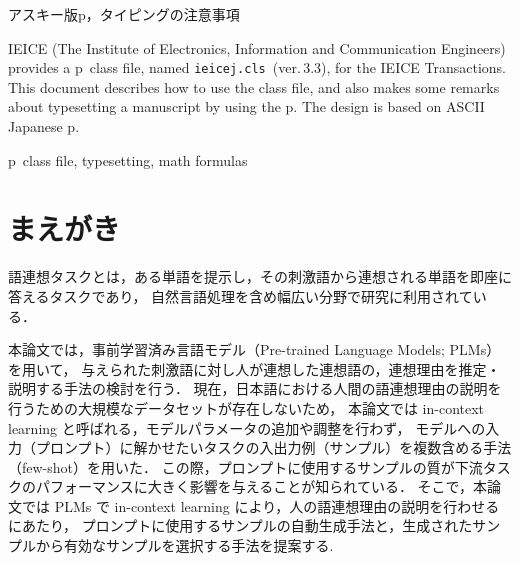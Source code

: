 \documentclass[letter]{ieicej}%
\def\IEICEJcls{\texttt{ieicej.cls}}
\def\IEICEJver{3.3}
\begin{document}
\makeatletter
\if@letter
\makeatother
\maketitle
\fi
\begin{abstract}
電子情報通信学会論文誌の p\LaTeXe\ クラスファイル，
\IEICEJcls{}（\texttt{version \IEICEJver}）の使い方を説明します．
本クラスファイルに基づく記述の仕方，クラスファイル使用上の注意点，
ならびにタイピングの際の注意事項です．
本クラスファイルは，アスキー版 p\LaTeXe\ に基づいて作成しています．
\end{abstract}
\begin{keyword}
アスキー版p\LaTeXe{}，タイピングの注意事項
\end{keyword}
\begin{eabstract}
IEICE (The Institute of Electronics, Information and Communication Engineers) 
provides a p\LaTeXe\ class file, named \IEICEJcls\ (ver.\,\IEICEJver), 
for the IEICE Transactions. This document describes how to use 
the class file, and also makes some remarks about typesetting 
a manuscript by using the p\LaTeXe. 
The design is based on ASCII Japanese p\LaTeXe. 
\end{eabstract}
\begin{ekeyword}
p\LaTeXe\ class file, typesetting, math formulas
\end{ekeyword}
\makeatletter
\if@letter
\makeatother
\else
 \maketitle
\fi

\section{まえがき}

語連想タスクとは，ある単語を提示し，その刺激語から連想される単語を即座に答えるタスクであり，
自然言語処理を含め幅広い分野で研究に利用されている\cite{liu-etal-2022-wax,de2019small}．

本論文では，事前学習済み言語モデル（Pre-trained Language Models; PLMs）を用いて，
与えられた刺激語に対し人が連想した連想語の，連想理由を推定・説明する手法の検討を行う．
現在，日本語における人間の語連想理由の説明を行うための大規模なデータセットが存在しないため，
本論文では in-context learning と呼ばれる，モデルパラメータの追加や調整を行わず，
モデルへの入力（プロンプト）に解かせたいタスクの入出力例（サンプル）を複数含める手法（few-shot）を用いた．
この際，プロンプトに使用するサンプルの質が下流タスクのパフォーマンスに大きく影響を与えることが知られている．
そこで，本論文では PLMs で in-context learning により，人の語連想理由の説明を行わせるにあたり，
プロンプトに使用するサンプルの自動生成手法と，生成されたサンプルから有効なサンプルを選択する手法を提案する.
\end{document}
